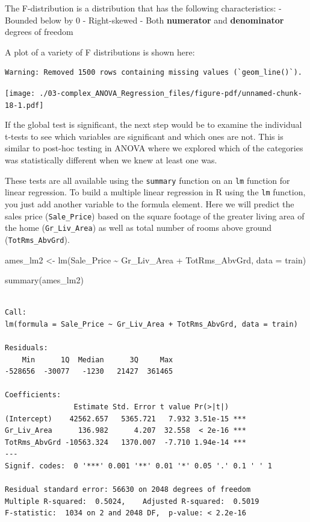 \documentclass[
  letterpaper,
  DIV=11,
  numbers=noendperiod]{scrreprt}
\newenvironment{Shaded}{\begin{snugshade}}{\end{snugshade}}
\newcommand{\AttributeTok}[1]{\textcolor[rgb]{0.40,0.45,0.13}{#1}}
\newcommand{\FunctionTok}[1]{\textcolor[rgb]{0.28,0.35,0.67}{#1}}
\newcommand{\NormalTok}[1]{\textcolor[rgb]{0.00,0.23,0.31}{#1}}
\newcommand{\OtherTok}[1]{\textcolor[rgb]{0.00,0.23,0.31}{#1}}
\newcommand{\SpecialCharTok}[1]{\textcolor[rgb]{0.37,0.37,0.37}{#1}}
\begin{document}
The F-distribution is a distribution that has the following
characteristics: - Bounded below by 0 - Right-skewed - Both
\textbf{numerator} and \textbf{denominator} degrees of freedom

A plot of a variety of F distributions is shown here:

\begin{verbatim}
Warning: Removed 1500 rows containing missing values (`geom_line()`).
\end{verbatim}

\texttt{[image: ./03-complex\_ANOVA\_Regression\_files/figure-pdf/unnamed-chunk-18-1.pdf]}

If the global test is significant, the next step would be to examine the
individual t-tests to see which variables are significant and which ones
are not. This is similar to post-hoc testing in ANOVA where we explored
which of the categories was statistically different when we knew at
least one was.

These tests are all available using the \texttt{summary} function on an
\texttt{lm} function for linear regression. To build a multiple linear
regression in R using the \texttt{lm} function, you just add another
variable to the formula element. Here we will predict the sales price
(\texttt{Sale\_Price}) based on the square footage of the greater living
area of the home (\texttt{Gr\_Liv\_Area}) as well as total number of
rooms above ground (\texttt{TotRms\_AbvGrd}).

\begin{Shaded}
\begin{Highlighting}[]
\NormalTok{ames\_lm2 }\OtherTok{\textless{}{-}} \FunctionTok{lm}\NormalTok{(Sale\_Price }\SpecialCharTok{\textasciitilde{}}\NormalTok{ Gr\_Liv\_Area }\SpecialCharTok{+}\NormalTok{ TotRms\_AbvGrd, }\AttributeTok{data =}\NormalTok{ train)}

\FunctionTok{summary}\NormalTok{(ames\_lm2)}
\end{Highlighting}
\end{Shaded}

\begin{verbatim}

Call:
lm(formula = Sale_Price ~ Gr_Liv_Area + TotRms_AbvGrd, data = train)

Residuals:
    Min      1Q  Median      3Q     Max 
-528656  -30077   -1230   21427  361465 

Coefficients:
                Estimate Std. Error t value Pr(>|t|)    
(Intercept)    42562.657   5365.721   7.932 3.51e-15 ***
Gr_Liv_Area      136.982      4.207  32.558  < 2e-16 ***
TotRms_AbvGrd -10563.324   1370.007  -7.710 1.94e-14 ***
---
Signif. codes:  0 '***' 0.001 '**' 0.01 '*' 0.05 '.' 0.1 ' ' 1

Residual standard error: 56630 on 2048 degrees of freedom
Multiple R-squared:  0.5024,    Adjusted R-squared:  0.5019 
F-statistic:  1034 on 2 and 2048 DF,  p-value: < 2.2e-16
\end{verbatim}
\end{document}
